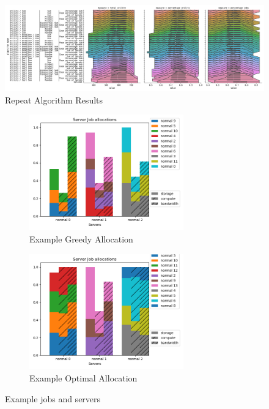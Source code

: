 \documentclass[fleqn]{article}
\begin{document}
\begin{figure}[H]
    \centering
    \includegraphics[width=1\linewidth]{../results/repeat_greedy_algorithms.png}
    \caption{Repeat Algorithm Results}
\end{figure}

\begin{figure}[H]
    \begin{subfigure}{0.5\textwidth}
        \includegraphics[width=1\linewidth, height=5cm]{../results/greedy_allocation.png}
        \caption{Example Greedy Allocation}
    \end{subfigure}
    \begin{subfigure}{0.5\textwidth}
        \includegraphics[width=1\linewidth, height=5cm]{../results/optimal_allocation.png}
        \caption{Example Optimal Allocation}
    \end{subfigure}
    \caption{Example jobs and servers}
\end{figure}
\end{document}
